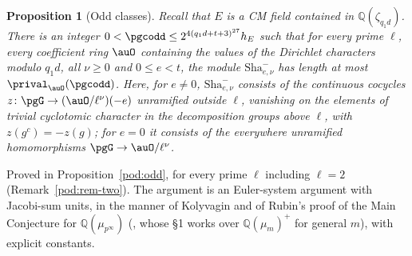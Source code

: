 \documentclass[10pt]{amsart}
\newtheorem{proposition}[theorem]{Proposition}
\theoremstyle{definition}
\theoremstyle{remark}
\newcommand{\Q}{\mathbb Q}
\begin{document}
\begin{proposition}[Odd classes]\label{pri:odd}
Recall that $E$ is a CM field contained in $\Q(\zeta_{q_1d})$. There is an integer
$0<\pgcodd\le2^{4(q_1d+t+3)^{27}}h_E$ such that for every prime $\ell$, every
coefficient ring $\auO$ containing the values of the Dirichlet characters modulo $q_1d$, all $\nu\ge0$
and $0\le e<t$, the module $\mathrm{Sha}^-_{e,\nu}$ has length at most $\prival_\auO(\pgcodd)$. Here,
for $e\ne0$, $\mathrm{Sha}^-_{e,\nu}$ consists of the continuous cocycles $z\colon\pgG\to
(\auO/\ell^\nu)(-e)$ unramified outside $\ell$, vanishing on the elements of trivial cyclotomic
character in the decomposition groups above $\ell$, with $z(g^c)=-z(g)$; for $e=0$ it consists of
the everywhere unramified homomorphisms $\pgG\to\auO/\ell^\nu$.
\end{proposition}
\noindent Proved in Proposition~\ref{pod:odd}, for every prime $\ell$ including $\ell=2$
(Remark~\ref{pod:rem-two}). The argument is an Euler-system argument with Jacobi-sum units, in the
manner of Kolyvagin and of Rubin's proof of the Main Conjecture for $\Q(\mu_{p^\infty})$ (\cite[Appendix by K.~Rubin, p.~397 ff.]{LangCyclo},
whose \S1 works over $\Q(\mu_m)^+$ for general $m$), with explicit constants.\par\smallskip
\end{document}
